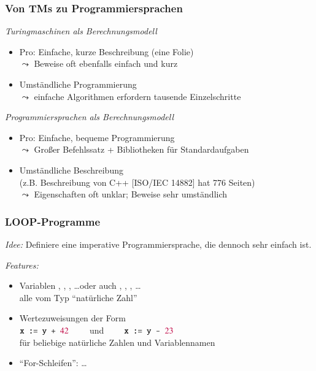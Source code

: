 \documentclass[aspectratio=1610,onlymath]{beamer}
\begin{document}
\begin{frame}\frametitle{Von TMs zu Programmiersprachen}

\emph{Turingmaschinen als Berechnungsmodell}
\begin{itemize}
\item \alert{Pro:} Einfache, kurze Beschreibung (eine Folie)\\
	$\leadsto$ Beweise oft ebenfalls einfach und kurz
\item {} Umständliche Programmierung\\
	$\leadsto$ einfache Algorithmen erfordern tausende Einzelschritte
\end{itemize}
\bigskip\pause

\emph{Programmiersprachen als Berechnungsmodell}
\begin{itemize}
\item \alert{Pro:} Einfache, bequeme Programmierung\\
	$\leadsto$ Großer Befehlssatz + Bibliotheken für Standardaufgaben
\item {} Umständliche Beschreibung\\
	(z.B. Beschreibung von C++ [ISO/IEC 14882] hat 776 Seiten)\\
	$\leadsto$ Eigenschaften oft unklar; Beweise sehr umständlich
\end{itemize}

\end{frame}

\begin{frame}\frametitle{LOOP-Programme}

\emph{Idee:} Definiere eine imperative Programmiersprache, die dennoch sehr einfach ist.
\bigskip

\emph{Features:}
\begin{itemize}
\item Variablen , , , \ldots oder auch , , , \ldots\\
alle vom Typ ``natürliche Zahl''
\item Wertezuweisungen der Form\\[1ex]
\mbox{}\hfill%
$\texttt{x} \texttt{ := } \texttt{y} \texttt{ + } \textcolor{purple}{42}\qquad$ und $\qquad\texttt{x} \texttt{ := } \texttt{y} \texttt{ - } \textcolor{purple}{23}$\hfill\mbox{}\\[1ex]
%
für beliebige natürliche Zahlen und Variablennamen
\item ``For-Schleifen'':  \ldots{} \SEndLoop
\end{itemize}

\end{frame}
\end{document}
